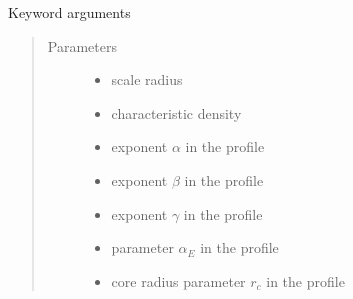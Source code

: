 \documentclass[letterpaper,10pt,english]{sphinxmanual}
\begin{document}
\begin{fulllineitems}
\begin{quote}
\begin{description}
\end{description}\end{quote}

\sphinxAtStartPar
Keyword arguments
\begin{quote}\begin{description}
\item[{Parameters}] \leavevmode\begin{itemize}
\item {} 
\sphinxAtStartPar
{} \textendash{} scale radius

\item {} 
\sphinxAtStartPar
{} \textendash{} characteristic density

\item {} 
\sphinxAtStartPar
{} \textendash{} exponent \(\alpha\) in the {\hyperref[\detokenize{diffsph.profiles:diffsph.profiles.templates.hdz}]{}} profile

\item {} 
\sphinxAtStartPar
{} \textendash{} exponent \(\beta\) in the {\hyperref[\detokenize{diffsph.profiles:diffsph.profiles.templates.hdz}]{}} profile

\item {} 
\sphinxAtStartPar
{} \textendash{} exponent \(\gamma\) in the {\hyperref[\detokenize{diffsph.profiles:diffsph.profiles.templates.hdz}]{}} profile

\item {} 
\sphinxAtStartPar
{} \textendash{} parameter \(\alpha_E\) in the {\hyperref[\detokenize{diffsph.profiles:diffsph.profiles.templates.enst}]{}} profile

\item {} 
\sphinxAtStartPar
{} \textendash{} core radius parameter \(r_c\) in the {\hyperref[\detokenize{diffsph.profiles:diffsph.profiles.templates.cnfw}]{}} profile


\end{itemize}
\end{description}
\end{quote}
\end{fulllineitems}
\end{document}
